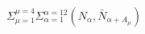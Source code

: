 \begin{equation}
\Sigma_{\mu=1}^{\mu=4} \Sigma_{\alpha=1}^{\alpha=12}
\left( N_{\alpha}, \bar{N}_{\alpha + A_{\mu}} \right)
\label{fermions2}
\end{equation}

